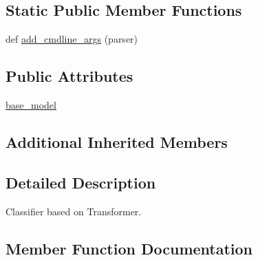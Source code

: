 \subsection*{Static Public Member Functions}
\begin{DoxyCompactItemize}
\item 
def \hyperlink{classparlai_1_1agents_1_1transformer__classifier_1_1transformer__classifier_1_1TransformerClassifierAgent_aedef4e7b90acc77302db619b742f7ab4}{add\+\_\+cmdline\+\_\+args} (parser)
\end{DoxyCompactItemize}
\subsection*{Public Attributes}
\begin{DoxyCompactItemize}
\item 
\hyperlink{classparlai_1_1agents_1_1transformer__classifier_1_1transformer__classifier_1_1TransformerClassifierAgent_a9893f246ed245dd63751b31e1ce9b8ef}{base\+\_\+model}
\end{DoxyCompactItemize}
\subsection*{Additional Inherited Members}


\subsection{Detailed Description}
\begin{DoxyVerb}Classifier based on Transformer.
\end{DoxyVerb}
 

\subsection{Member Function Documentation}
\mbox{\label{classparlai_1_1agents_1_1transformer__classifier_1_1transformer__classifier_1_1TransformerClassifierAgent_aedef4e7b90acc77302db619b742f7ab4}} 
